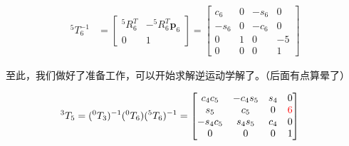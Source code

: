 \documentclass{ctexart}
\begin{document}
\begin{equation}
	\begin{aligned}
		^5T_6^{-1}&=\begin{bmatrix}
			^5R_6^T & -^5R_6^T\mathbf{p}_6 \\
			0 & 1
		\end{bmatrix}=
		\begin{bmatrix}
			c_6 & 0 & -s_6 & 0 \\
			-s_6 & 0 & -c_6 & 0 \\
			0 & 1 & 0 & -5 \\
			0 & 0 & 0 & 1
			\end{bmatrix}
	\end{aligned}
\end{equation}

至此，我们做好了准备工作，可以开始求解逆运动学解了。（后面有点算晕了）

\begin{equation}
	\begin{aligned}
		^3T_5&=(^0T_3)^{-1}(^0T_6)(^5T_6)^{-1}
		=\begin{bmatrix}
			c_4c_5 & -c_4s_5 & s_4 & 0 \\
			s_5 & c_5 & 0 & \textcolor{red}{6}\\
			-s_4c_5 & s_4s_5 & c_4 & 0 \\
			0 & 0 & 0 & 1
		\end{bmatrix}
	\end{aligned}
\end{equation}
\end{document}
